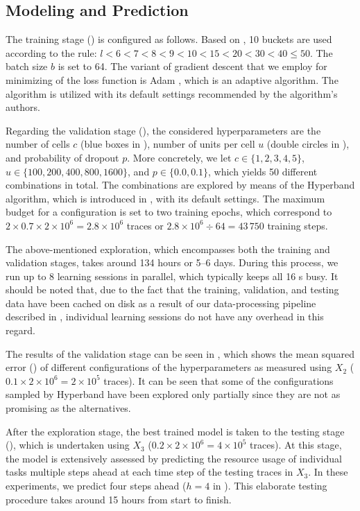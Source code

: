 \subsection{Modeling and Prediction}
The training stage () is configured as follows. Based on
, 10 buckets are used according to the rule: $l < 6 < 7 < 8 < 9 <
10 < 15 < 20 < 30 < 40 \leq 50$. The batch size $b$ is set to 64. The variant of
gradient descent that we employ for minimizing of the loss function is Adam
\cite{kingma2014}, which is an adaptive algorithm. The algorithm is utilized
with its default settings recommended by the algorithm's authors.

Regarding the validation stage (), the considered
hyperparameters are the number of cells $c$ (blue boxes in ), number
of units per cell $u$ (double circles in ), and probability of
dropout $p$. More concretely, we let $c \in \{1, 2, 3, 4, 5\}$, $u \in \{100,
200, 400, 800, 1600\}$, and $p \in \{0.0, 0.1\}$, which yields 50 different
combinations in total. The combinations are explored by means of the Hyperband
algorithm, which is introduced in , with its default settings.
The maximum budget for a configuration is set to two training epochs, which
correspond to $2 \times 0.7 \times 2 \times 10^6 = 2.8 \times 10^6$ traces or
$2.8 \times 10^6 \div 64 = 43\,750$ training steps.

The above-mentioned exploration, which encompasses both the training and
validation stages, takes around 134 hours or 5--6 days. During this process, we
run up to 8 learning sessions in parallel, which typically keeps all 16
s busy. It should be noted that, due to the fact that the training,
validation, and testing data have been cached on disk as a result of our
data-processing pipeline described in , individual learning sessions
do not have any overhead in this regard.


The results of the validation stage can be seen in , which
shows the mean squared error () of different configurations of the
hyperparameters as measured using $X_2$ ($0.1 \times 2 \times 10^6 = 2 \times
10^5$ traces). It can be seen that some of the configurations sampled by
Hyperband have been explored only partially since they are not as promising as
the alternatives.

After the exploration stage, the best trained model is taken to the testing
stage (), which is undertaken using $X_3$ ($0.2 \times 2 \times
10^6 = 4 \times 10^5$ traces). At this stage, the model is extensively assessed
by predicting the resource usage of individual tasks multiple steps ahead at
each time step of the testing traces in $X_3$. In these experiments, we predict
four steps ahead ($h = 4$ in ). This elaborate testing procedure
takes around 15 hours from start to finish.

